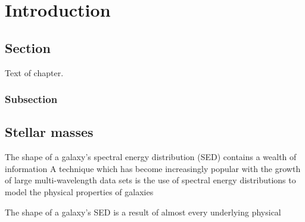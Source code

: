 
\chapter[Introduction]{Introduction} 
\label{ch:introduction}

\section[Sec]{Section}
\label{sec:section1_label}

Text of chapter.  

\subsection[Subsec]{Subsection}
\label{sec:subsec1_label}


\section[SED]{Stellar masses}
The shape of a galaxy's spectral energy distribution (SED) contains a wealth of information
A technique which has become increasingly popular with the growth of large multi-wavelength data sets is the use of spectral energy distributions to model the physical properties of galaxies 

The shape of a galaxy's SED is a result of almost every underlying physical 



